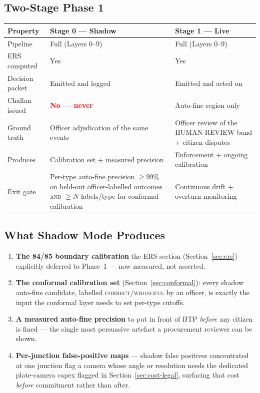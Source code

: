 \documentclass[11pt,a4paper]{article}
\begin{document}
\subsection*{Two-Stage Phase 1}

\begin{center}
\begin{tabular}{L{3.6cm} L{5.2cm} L{5.2cm}}
    \toprule
    \color{white}\textbf{Property} & \color{white}\textbf{Stage 0 — Shadow} & \color{white}\textbf{Stage 1 — Live} \\
    \midrule
    Pipeline & Full (Layers 0--9) & Full (Layers 0--9) \\
    ERS computed & Yes & Yes \\
    Decision packet & Emitted and logged & Emitted and acted on \\
    Challan issued & \textcolor{red}{\textbf{No --- never}} & Auto-fine region only \\
    Ground truth & Officer adjudication of the same events & Officer review of the HUMAN-REVIEW band + citizen disputes \\
    Produces & Calibration set + measured precision & Enforcement + ongoing calibration \\
    Exit gate & Per-type auto-fine precision $\geq 99\%$ on held-out officer-labelled outcomes \textsc{and} $\geq N$ labels/type for conformal calibration & Continuous drift + overturn monitoring \\
    \bottomrule
\end{tabular}
\end{center}

\subsection*{What Shadow Mode Produces}

\begin{enumerate}[leftmargin=1.8em, itemsep=0.25em]
    \item \textbf{The 84/85 boundary calibration} the ERS section (Section~\ref{sec:ers}) explicitly deferred to Phase~1 --- now measured, not asserted.
    \item \textbf{The conformal calibration set} (Section~\ref{sec:conformal}): every shadow auto-fine candidate, labelled \textsc{correct}/\textsc{wrongful} by an officer, is exactly the input the conformal layer needs to set per-type cutoffs.
    \item \textbf{A measured auto-fine precision} to put in front of BTP \emph{before} any citizen is fined --- the single most persuasive artefact a procurement reviewer can be shown.
    \item \textbf{Per-junction false-positive maps} --- shadow false positives concentrated at one junction flag a camera whose angle or resolution needs the dedicated plate-camera capex flagged in Section~\ref{sec:cost-legal}, surfacing that cost \emph{before} commitment rather than after.
\end{enumerate}
\end{document}
